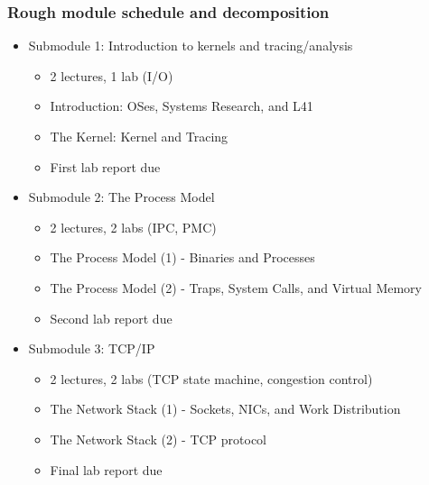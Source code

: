 \begin{frame}
  \frametitle{Rough module schedule and decomposition}

  \begin{itemize}
    \item Submodule 1: Introduction to kernels and tracing/analysis
    \begin{itemize}
      \item 2 lectures, 1 lab (I/O)
      \item Introduction: OSes, Systems Research, and L41
      \item The Kernel: Kernel and Tracing
      \item First lab report due
    \end{itemize}

    \pause
    \bigskip
    \item Submodule 2: The Process Model
    \begin{itemize}
      \item 2 lectures, 2 labs (IPC, PMC)
      \item The Process Model (1) - Binaries and Processes
      \item The Process Model (2) - Traps, System Calls, and Virtual Memory
      \item Second lab report due
    \end{itemize}

    \pause
    \bigskip
    \item Submodule 3: TCP/IP
    \begin{itemize}
      \item 2 lectures, 2 labs (TCP state machine, congestion control)
      \item The Network Stack (1) - Sockets, NICs, and Work Distribution
      \item The Network Stack (2) - TCP protocol
      \item Final lab report due
    \end{itemize}
  \end{itemize}
\end{frame}

